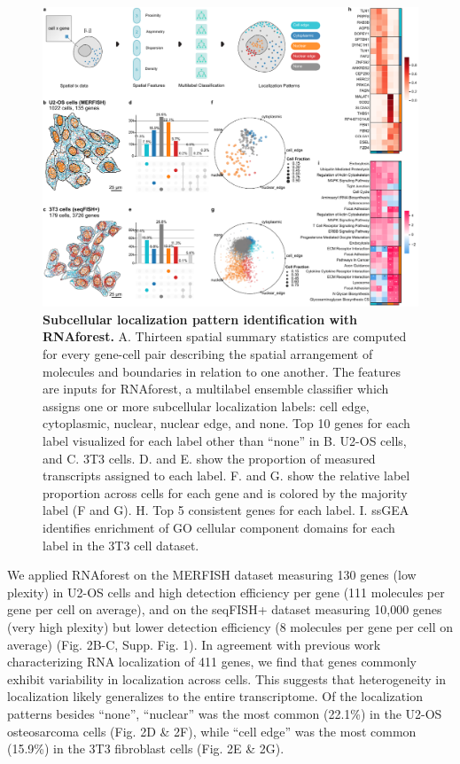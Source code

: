 \begin{figure}[p]
    \centering
    \includegraphics[width=\textwidth]{1_figures-and-files/Fig2.pdf}
    \caption[Subcellular localization pattern identification with RNAforest.]{\textbf{Subcellular localization pattern identification with RNAforest.} A. Thirteen spatial summary statistics are computed for every gene-cell pair describing the spatial arrangement of molecules and boundaries in relation to one another. The features are inputs for RNAforest, a multilabel ensemble classifier which assigns one or more subcellular localization labels: cell edge, cytoplasmic, nuclear, nuclear edge, and none. Top 10 genes for each label visualized for each label other than “none” in B. U2-OS cells, and C. 3T3 cells. D. and E. show the proportion of measured transcripts assigned to each label. F. and G. show the relative label proportion across cells for each gene and is colored by the majority label (F and G). H. Top 5 consistent genes for each label. I. ssGEA identifies enrichment of GO cellular component domains for each label in the 3T3 cell dataset.
    }
    \label{fig:2 RNAforest localization pattern identification}
\end{figure}

We applied RNAforest on the MERFISH dataset measuring 130 genes (low plexity) in U2-OS cells and high detection efficiency per gene (111 molecules per gene per cell on average), and on the seqFISH+ dataset measuring 10,000 genes (very high plexity) but lower detection efficiency (8 molecules per gene per cell on average) (Fig. 2B-C, Supp. Fig. 1). In agreement with previous work characterizing RNA localization of 411 genes\cite{chouaibDualProteinmRNALocalization2020}, we find that genes commonly exhibit variability in localization across cells. This suggests that heterogeneity in localization likely generalizes to the entire transcriptome. Of the localization patterns besides ``none'', ``nuclear'' was the most common (22.1\%) in the U2-OS osteosarcoma cells (Fig. 2D \& 2F), while ``cell edge'' was the most common (15.9\%) in the 3T3 fibroblast cells (Fig. 2E \& 2G). 

